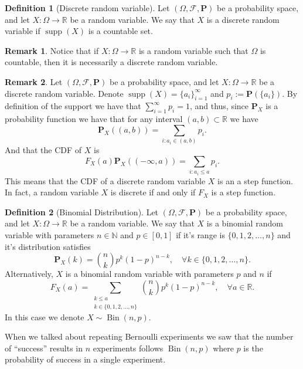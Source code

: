 \documentclass[11pt,a4paper]{article}
\theoremstyle{definition}
\newtheorem{definition}{Definition}[section]
\newtheorem{remark}{Remark}[section]
\theoremstyle{plain}
\DeclareMathOperator{\supp}{supp}
\DeclareMathOperator{\Bin}{Bin}
\newcommand{\N}{\mathbb{N}}
\newcommand{\R}{\mathbb{R}}
\begin{document}
  \begin{definition}[Discrete random variable]
    Let $(\Omega ,\mathcal F, \mathbf P)$ be a probability space,
    and let $X \colon \Omega \to \R$ be a random variable.
    We say that $X$ is a discrete random variable if $\supp(X)$ is a 
    countable set.
  \end{definition}
  \begin{remark}
    Notice that if $X \colon \Omega \to \R$ is a random variable such
    that $\Omega$ is countable, then it is necessarily a discrete random
    variable.
  \end{remark}
  \begin{remark}
    Let $(\Omega ,\mathcal F, \mathbf P)$ be a probability space,
    and let $X \colon \Omega \to \R$ be a discrete random variable.
    Denote $\supp(X) = \{a_i\}_{i=1}^{\infty}$ and $p_i := \mathbf P(\{a_i\})$.
    By definition of the support we have that $\sum_{i=1}^{\infty} p_i = 1$,
    and thus, since $\mathbf P_X$ is a probability function we have that
    for any interval $(a,b) \subset \R$ we have
    \[
      \mathbf P_X \left((a,b)\right) = \sum_{i \colon a_i \in (a,b)} p_i.
    \]
    And that the CDF of $X$ is
    \[
      F_X(a)
      \mathbf P_X \left((-\infty,a)\right) = \sum_{i \colon a_i \le a} p_i.
    \]
    This means that the CDF of a discrete random variable $X$ is an a step
    function. In fact, a random variable $X$ is discrete if and only if
    $F_X$ is a step function.
  \end{remark}

  \begin{definition}[Binomial Distribution]
    Let $(\Omega ,\mathcal F, \mathbf P)$ be a probability space,
    and let $X \colon \Omega \to \R$ be a random variable.
    We say that $X$ is a binomial random variable with parameters
    $n \in \N$ and $p \in [0,1]$ if it's range is $\{0,1,2,\dots,n\}$ and
    it's distribution satisfies
    \[
      \mathbf P_X(k) = \binom{n}{k} p^k (1-p)^{n-k}, \quad 
      \forall k \in \{0,1,2,\dots,n\}.
    \]
    Alternatively, $X$ is a binomial random variable with parameters
    $p$ and $n$ if
    \[
      F_X(a) = \sum_{\substack{k \le a \\ k \in \{0,1,2,\dots,n\}}}
      \binom{n}{k} p^k (1-p)^{n-k}, \quad \forall a \in \R.
    \]
    In this case we denote $X \sim \Bin(n,p)$.
  \end{definition}
  When we talked about repeating Bernoulli experiments we saw that the number
  of ``success'' results in $n$ experiments follows $\Bin(n,p)$ where
  $p$ is the probability of success in a single experiment.
  
\end{document}
